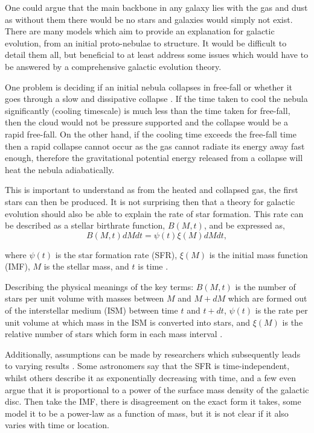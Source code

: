 \documentclass[12pt, twocolumn]{revtex4-1}    %
\begin{document}

One could argue that the main backbone in any galaxy lies with the gas and dust as without them there would be no stars and galaxies would simply not exist. There are many models which aim to provide an explanation for galactic evolution, from an initial proto-nebulae to structure. It would be difficult to detail them all, but beneficial to at least address some issues which would have to be answered by a comprehensive galactic evolution theory. 

One problem is deciding if an initial nebula collapses in free-fall or whether it goes through a slow and dissipative collapse \citep{carroll_astro}. If the time taken to cool the nebula significantly (cooling timescale) is much less than the time taken for free-fall, then the cloud would not be pressure supported and the collapse would be a rapid free-fall. On the other hand, if the cooling time exceeds the free-fall time then a rapid collapse cannot occur as the gas cannot radiate its energy away fast enough, therefore the gravitational potential energy released from a collapse will heat the nebula adiabatically. 

This is important to understand as from the heated and collapsed gas, the first stars can then be produced. It is not surprising then that a theory for galactic evolution should also be able to explain the rate of star formation. This rate can be described as a stellar birthrate function, $B(M,t)$, and be expressed as,
\begin{equation}
B(M,t)dM dt = \psi (t) \xi (M) dM dt, 
\label{eqn:stellar_birth_rate}
\end{equation}

where $\psi(t)$ is the star formation rate (SFR), $\xi (M)$ is the initial mass function (IMF), $M$ is the stellar mass, and $t$ is time \citep{carroll_astro}. 

Describing the physical meanings of the key terms: $B(M,t)$ is the number of stars per unit volume with masses between $M$ and $M+dM$ which are formed out of the interstellar medium (ISM) between time $t$ and $t+dt$, $\psi(t)$ is the rate per unit volume at which mass in the ISM is converted into stars, and $\xi(M)$ is the relative number of stars which form in each mass interval \citep{carroll_astro}. 

Additionally, assumptions can be made by researchers which subsequently leads to varying results \citep{carroll_astro}. Some astronomers say that the SFR is time-independent, whilst others describe it as exponentially decreasing with time, and a few even argue that it is proportional to a power of the surface mass density of the galactic disc. Then take the IMF, there is disagreement on the exact form it takes, some model it to be a power-law as a function of mass, but it is not clear if it also varies with time or location.
\end{document}
